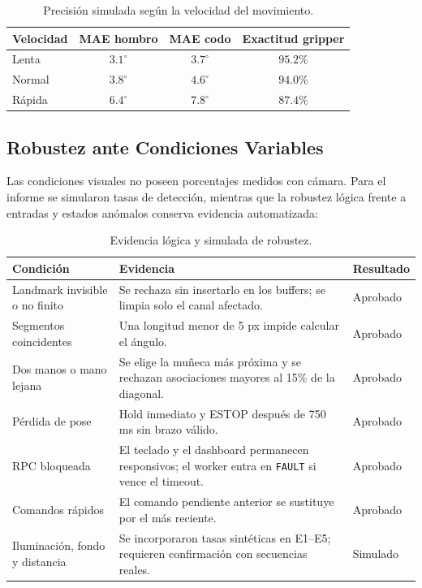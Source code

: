 \begin{table}[H]
    \centering
    \renewcommand{\arraystretch}{1.15}
    \begin{tabular}{lccc}
        \toprule
        \textbf{Velocidad} & \textbf{MAE hombro} & \textbf{MAE codo} &
        \textbf{Exactitud gripper} \\
        \midrule
        Lenta & $3.1^\circ$ & $3.7^\circ$ & $95.2\%$ \\
        Normal & $3.8^\circ$ & $4.6^\circ$ & $94.0\%$ \\
        Rápida & $6.4^\circ$ & $7.8^\circ$ & $87.4\%$ \\
        \bottomrule
    \end{tabular}
    \caption{Precisión simulada según la velocidad del movimiento.}
    \label{tab:precision_velocidad_simulada}
\end{table}

\subsection{Robustez ante Condiciones Variables}
\label{subsec:resultados_robustez}

Las condiciones visuales no poseen porcentajes medidos con cámara. Para el
informe se simularon tasas de detección, mientras que la robustez lógica frente
a entradas y estados anómalos conserva evidencia automatizada:

\begin{table}[H]
    \centering
    \renewcommand{\arraystretch}{1.2}
    \small
    \begin{tabularx}{\textwidth}{p{3.5cm} X p{2.6cm}}
        \toprule
        \textbf{Condición} & \textbf{Evidencia} & \textbf{Resultado} \\
        \midrule
        Landmark invisible o no finito &
        Se rechaza sin insertarlo en los buffers; se limpia solo el canal
        afectado. & Aprobado \\
        Segmentos coincidentes &
        Una longitud menor de 5 px impide calcular el ángulo. & Aprobado \\
        Dos manos o mano lejana &
        Se elige la muñeca más próxima y se rechazan asociaciones mayores al
        15\% de la diagonal. & Aprobado \\
        Pérdida de pose &
        Hold inmediato y ESTOP después de 750 ms sin brazo válido. & Aprobado \\
        RPC bloqueada &
        El teclado y el dashboard permanecen responsivos; el worker entra en
        \texttt{FAULT} si vence el timeout. & Aprobado \\
        Comandos rápidos &
        El comando pendiente anterior se sustituye por el más reciente. &
        Aprobado \\
        Iluminación, fondo y distancia &
        Se incorporaron tasas sintéticas en E1--E5; requieren confirmación con
        secuencias reales. & Simulado \\
        \bottomrule
    \end{tabularx}
    \caption{Evidencia lógica y simulada de robustez.}
    \label{tab:resultados_robustez}
\end{table}

